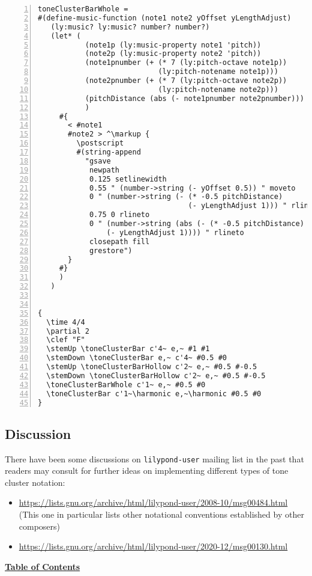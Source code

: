 \begin{Verbatim}[numbers=left,xleftmargin=5mm]
toneClusterBarWhole =
#(define-music-function (note1 note2 yOffset yLengthAdjust)
   (ly:music? ly:music? number? number?)
   (let* (
           (note1p (ly:music-property note1 'pitch))
           (note2p (ly:music-property note2 'pitch))
           (note1pnumber (+ (* 7 (ly:pitch-octave note1p))
                            (ly:pitch-notename note1p)))
           (note2pnumber (+ (* 7 (ly:pitch-octave note2p))
                            (ly:pitch-notename note2p)))
           (pitchDistance (abs (- note1pnumber note2pnumber)))
           )
     #{
       < #note1
       #note2 > ^\markup {
         \postscript
         #(string-append
           "gsave
            newpath
            0.125 setlinewidth
            0.55 " (number->string (- yOffset 0.5)) " moveto
            0 " (number->string (- (* -0.5 pitchDistance)
                                   (- yLengthAdjust 1))) " rlineto
            0.75 0 rlineto
            0 " (number->string (abs (- (* -0.5 pitchDistance)
                (- yLengthAdjust 1)))) " rlineto
            closepath fill
            grestore")
       }
     #}
     )
   )


{
  \time 4/4
  \partial 2
  \clef "F"
  \stemUp \toneClusterBar c'4~ e,~ #1 #1
  \stemDown \toneClusterBar e,~ c'4~ #0.5 #0
  \stemUp \toneClusterBarHollow c'2~ e,~ #0.5 #-0.5
  \stemDown \toneClusterBarHollow c'2~ e,~ #0.5 #-0.5
  \toneClusterBarWhole c'1~ e,~ #0.5 #0
  \toneClusterBar c'1~\harmonic e,~\harmonic #0.5 #0
}
\end{Verbatim}
\label{sec:tone_cluster_discussion}
\subsection{Discussion}
There have been some discussions on \verb|lilypond-user| mailing list in the past that readers may consult for further ideas on implementing different types of tone cluster notation: 
\begin{itemize}
\item \url{https://lists.gnu.org/archive/html/lilypond-user/2008-10/msg00484.html} (This one in particular lists other notational conventions established by other composers)
\item \url{https://lists.gnu.org/archive/html/lilypond-user/2020-12/msg00130.html}

\end{itemize}
\hyperref[sec:toc]{\textbf{Table of Contents}}

\clearpage



